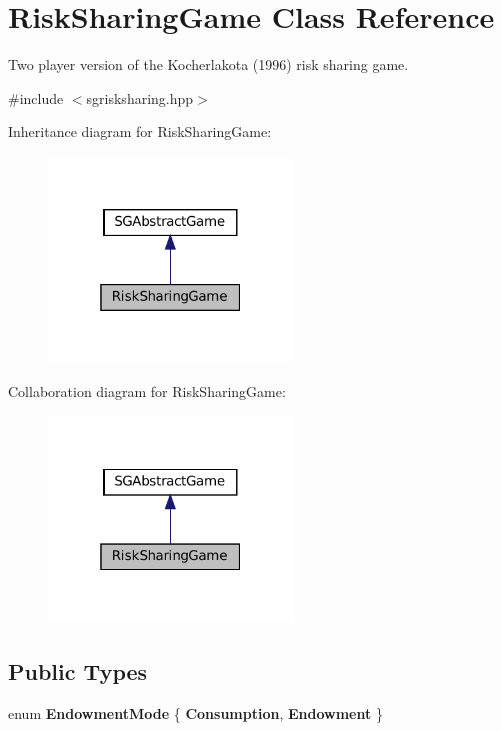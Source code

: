 \hypertarget{classRiskSharingGame}{}\section{Risk\+Sharing\+Game Class Reference}
\label{classRiskSharingGame}


Two player version of the Kocherlakota (1996) risk sharing game.  




{\ttfamily \#include $<$sgrisksharing.\+hpp$>$}



Inheritance diagram for Risk\+Sharing\+Game\+:
\nopagebreak
\begin{figure}[H]
\begin{center}
\leavevmode
\includegraphics[width=184pt]{classRiskSharingGame__inherit__graph}
\end{center}
\end{figure}


Collaboration diagram for Risk\+Sharing\+Game\+:
\nopagebreak
\begin{figure}[H]
\begin{center}
\leavevmode
\includegraphics[width=184pt]{classRiskSharingGame__coll__graph}
\end{center}
\end{figure}
\subsection*{Public Types}
\begin{DoxyCompactItemize}
\item 
\mbox{\label{classRiskSharingGame_a5645d88336b8df49bf98e6e2d109f4cf}} 
enum {\bfseries Endowment\+Mode} \{ {\bfseries Consumption}, 
{\bfseries Endowment}
 \}
\end{DoxyCompactItemize}

